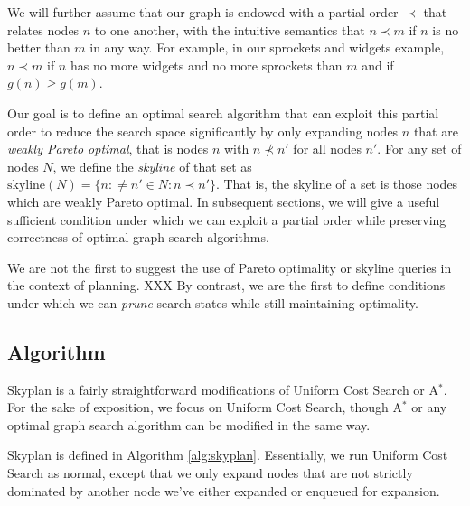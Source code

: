 \documentclass[letterpaper]{article}
\theoremstyle{plain} \newtheorem{theorem}{Theorem} \newtheorem{proposition}{Proposition} \newtheorem{lemma}{Lemma} \newtheorem*{corollary}{Corollary}
\theoremstyle{definition} \newtheorem{definition}{Definition} \newtheorem{conjecture}{Conjecture} \newtheorem*{example}{Example}
\theoremstyle{remark} \newtheorem*{remark}{Remark} \newtheorem*{note}{Note} \newtheorem{case}{Case}
\begin{document}
We will further assume that our graph is endowed with a partial order $\prec$
that relates nodes $n$ to one another, with the intuitive semantics that
$n \prec m$ if $n$ is no better than $m$ in any way. For example, in
our sprockets and widgets example, $n \prec m$ if $n$ has no more widgets and
no more sprockets than $m$ and if $g(n) \ge g(m)$. 

Our goal is to define an optimal search algorithm that can exploit
this partial order to reduce the search space significantly by only
expanding nodes $n$ that are \textit{weakly Pareto optimal}, that
is nodes $n$ with $n \nprec n'$ for all nodes $n'$. For any set of
nodes $N$, we define the \textit{skyline} of that set as
$\textrm{skyline}(N)=\{n: \ne n' \in N: n \prec n'\}$. That is, the
skyline of a set is those nodes which are weakly Pareto optimal.
In subsequent sections, we will give a useful sufficient condition under
which we can exploit a partial order while preserving correctness of optimal graph
search algorithms.

We are not the first to suggest the use of Pareto optimality or skyline queries
in the context of planning. XXX By contrast, we are the first to define conditions
under which we can \textit{prune} search states while still maintaining optimality.


\subsection{Algorithm}

Skyplan is a fairly straightforward modifications of Uniform
Cost Search or A$^*$. For the sake of exposition, we focus on Uniform Cost
Search, though A$^*$ or any optimal graph search algorithm can
be modified in the same way.

Skyplan is defined in Algorithm \ref{alg:skyplan}. Essentially, we run Uniform Cost Search as normal, except that 
we only expand nodes that are not strictly dominated by another
node we've either expanded or enqueued for expansion.
\end{document}

